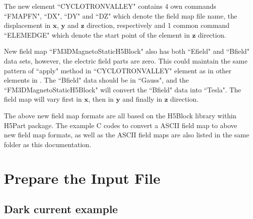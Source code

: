 \documentclass[a4paper,11pt]{article}
\begin{document}
The new element ``CYCLOTRONVALLEY" contains 4 own commands ``FMAPFN", ``DX", ``DY" and ``DZ" which denote the field map file name, the displacement in $\mathbf{x}$, $\mathbf{y}$ and $\mathbf{z}$ direction, respectively and 1 common command ``ELEMEDGE" which denote the start point of the element in $\mathbf{z}$ direction.

New field map ``FM3DMagnetoStaticH5Block" also has both ``Efield" and ``Bfield" data sets, however, the electric field parts are zero. This could maintain the same pattern of ``apply" method in ``CYCLOTRONVALLEY" element as in other elements in \opal. The ``Bfield" data should be in ``Gauss", and the ``FM3DMagnetoStaticH5Block" will convert the ``Bfield" data into ``Tesla". The field map will vary first in $\mathbf{x}$, then in $\mathbf{y}$ and finally in $\mathbf{z}$ direction.

The above new field map formats are all based on the H5Block library within H5Part package. The example C codes to convert a ASCII field map to above new field map formats, as well as the ASCII field maps are also listed in the same folder as this documentation.
\section{Prepare the Input File}
\subsection{Dark current example}
\end{document}
